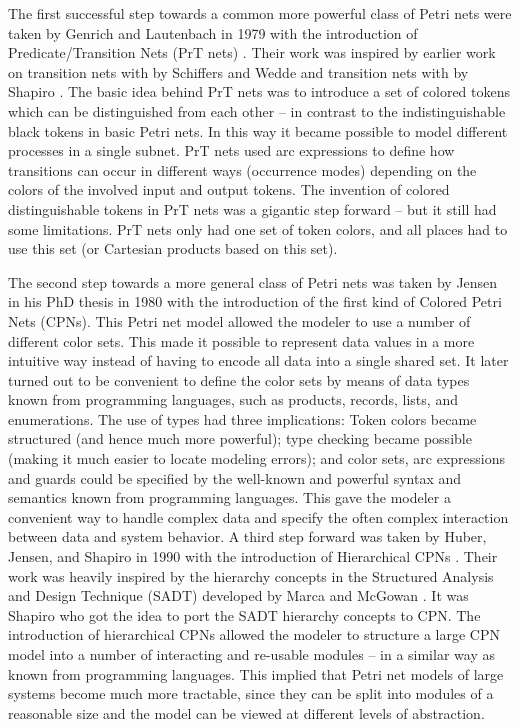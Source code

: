 The first successful step towards a common more powerful class of
Petri nets were taken by Genrich and Lautenbach in 1979 with the
introduction of Predicate/Transition Nets (PrT nets)
\cite{genrich:81}. Their work was inspired by earlier work on
transition nets with  by Schiffers and Wedde
\cite{schiffers:78} and transition nets with  by Shapiro \cite{shapiro:78}. The basic idea behind PrT
nets was to introduce a set of colored tokens which can be
distinguished from each other -- in contrast to the indistinguishable
black tokens in basic Petri nets. In this way it became possible to
model different processes in a single subnet. PrT nets used arc
expressions to define how transitions can occur in different ways
(occurrence modes) depending on the colors of the involved input and
output tokens. The invention of colored distinguishable tokens in PrT
nets was a gigantic step forward -- but it still had some
limitations. PrT nets only had one set of token colors, and all places
had to use this set (or Cartesian products based on this set).

The second step towards a more general class of Petri nets was taken
by Jensen in his PhD thesis in 1980 \cite{jensen:81} with the
introduction of the first kind of Colored Petri Nets (CPNs). This
Petri net model allowed the modeler to use a number of different color
sets. This made it possible to represent data values in a more
intuitive way instead of having to encode all data into a single
shared set. It later turned out to be convenient to define the color
sets by means of data types known from programming languages, such as
products, records, lists, and enumerations. The use of types had three
implications: Token colors became structured (and hence much more
powerful); type checking became possible (making it much easier to
locate modeling errors); and color sets, arc expressions and guards
could be specified by the well-known and powerful syntax and semantics
known from programming languages. This gave the modeler a convenient
way to handle complex data and specify the often complex interaction
between data and system behavior. A third step forward was taken by
Huber, Jensen, and Shapiro in 1990 with the introduction of
Hierarchical CPNs \cite{huber:91}. Their work was heavily inspired by
the hierarchy concepts in the Structured Analysis and Design Technique
(SADT) developed by Marca and McGowan \cite{sadt}. It was Shapiro who got
the idea to port the SADT hierarchy concepts to CPN.  The introduction
of hierarchical CPNs allowed the modeler to structure a large CPN
model into a number of interacting and re-usable modules -- in a
similar way as known from programming languages. This implied that
Petri net models of large systems become much more tractable, since
they can be split into modules of a reasonable size and the model can
be viewed at different levels of abstraction.


